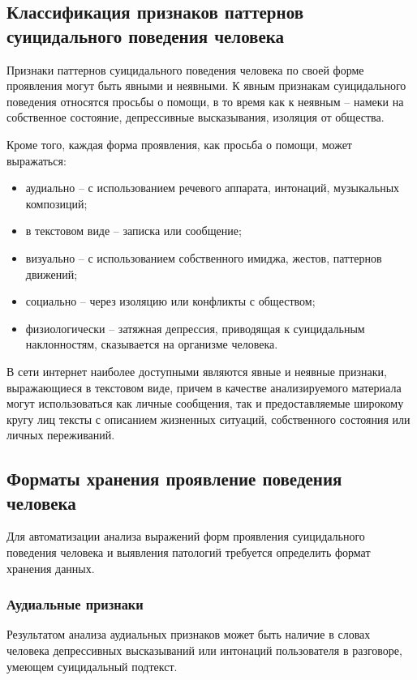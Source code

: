 \subsection{Классификация признаков паттернов суицидального поведения человека}

Признаки паттернов суицидального поведения человека по своей форме проявления могут быть явными и неявными. К явным признакам суицидального поведения относятся просьбы о помощи, в то время как к неявным -- намеки на собственное состояние, депрессивные высказывания, изоляция от общества.

Кроме того, каждая форма проявления, как просьба о помощи, может выражаться:

\begin{itemize}
	\item аудиально -- с использованием речевого аппарата, интонаций, музыкальных композиций;
	\item в текстовом виде -- записка или сообщение;
	\item визуально -- с использованием собственного имиджа, жестов, паттернов движений;
	\item социально -- через изоляцию или конфликты с обществом;
	\item физиологически -- затяжная депрессия, приводящая к суицидальным наклонностям, сказывается на организме человека.
\end{itemize}

В сети интернет наиболее доступными являются явные и неявные признаки, выражающиеся в текстовом виде, причем в качестве анализируемого материала могут использоваться как личные сообщения, так и предоставляемые широкому кругу лиц тексты с описанием жизненных ситуаций, собственного состояния или личных переживаний.

\subsection{Форматы хранения проявление поведения человека}

Для автоматизации анализа выражений форм проявления суицидального поведения человека и выявления патологий требуется определить формат хранения данных.

\subsubsection{Аудиальные признаки}

Результатом анализа аудиальных признаков может быть наличие в словах человека депрессивных высказываний или интонаций пользователя в разговоре, умеющем суицидальный подтекст.

